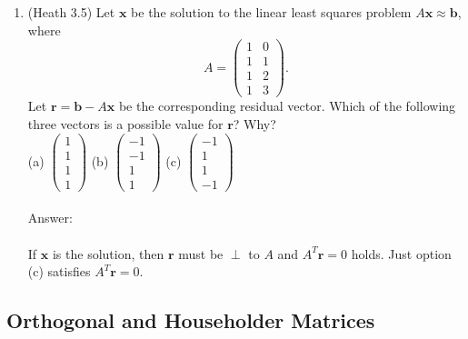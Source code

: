 \documentclass{article}
\renewcommand{\vec}[1]{\mathbf{#1}}
\newcommand{\x}{\vec{x}}
\renewcommand{\r}{\vec{r}}
\begin{document}
\begin{enumerate}
\item (Heath 3.5) Let $\vec{x}$ be the solution to the linear least squares problem $A\vec{x} \approx \vec{b}$, where
$$
A = \begin{pmatrix}
1 & 0 \\ 1 & 1 \\ 1 & 2 \\ 1 & 3
\end{pmatrix}.
$$
Let $\vec{r} = \vec{b} - A\vec{x}$ be the corresponding residual vector.  Which of the following three vectors is a possible value for $\vec{r}$?  Why?\\
(a) $\begin{pmatrix} 1 \\ 1 \\ 1 \\ 1 \end{pmatrix}$ \quad (b) $\begin{pmatrix} -1 \\ -1 \\ 1 \\ 1 \end{pmatrix}$ \quad (c) $\begin{pmatrix} -1 \\ 1 \\ 1 \\ -1 \end{pmatrix}$ \Large \checkmark \normalsize
\\ \vspace{0.5em} \\
Answer:\\
\\
If $\x$ is the solution, then $\r$ must be $\perp$ to $A$ and $A^T\r=0$ holds.  Just option (c) satisfies $A^T\r=0$.


\end{enumerate}

\subsection*{Orthogonal and Householder Matrices}
\end{document}
